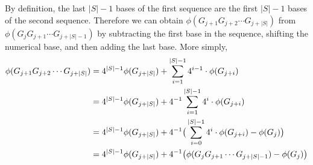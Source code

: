 \documentclass{article}[12pt]
\begin{document}
By definition, the last $|S| - 1$ bases of the first sequence
are the first $|S| - 1$ bases of the second sequence.
Therefore we can obtain $\phi(G_{j + 1} G_{j+2} \cdots G_{j + |S|} )$
from $\phi(G_{j} G_{j+1} \cdots G_{j + |S| - 1}) $ by subtracting the 
first base in the sequence, shifting the numerical base, and
then adding the last base.  
More simply,
\begin{align}
\phi(G_{j + 1} G_{j+2} \cdots G_{j + |S|} ) &= 
4^{|S| - 1} \phi( G_{ j + |S|} ) + \sum_{i = 1}^{|S| - 1} 4^{i - 1} \cdot \phi( G_{j + i} )
\notag \\
&= 4^{|S| - 1} \phi( G_{ j + |S|} ) + 4^{-1} \sum_{i = 1}^{|S| - 1} 4^{i} \cdot \phi (G_{j + i}) 
\notag \\
&= 4^{|S| - 1} \phi( G_{ j + |S|} ) + 4^{-1} \big( \sum_{i = 0}^{|S| - 1} 4^{i} \cdot \phi(G_{j + i} )
- \phi(G_{j}) \big)
\notag \\
&= 4^{|S| - 1} \phi( G_{ j + |S|} ) + 4^{-1} \big( \phi(G_{j} G_{j+1} \cdots G_{j + |S| - 1}) - \phi(G_{j}) \big)
\notag
\end{align}
\end{document}
